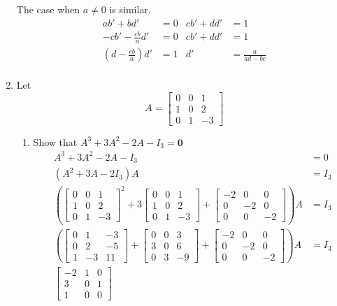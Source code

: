 \documentclass[letterpaper]{article}
\begin{document}
\begin{enumerate}
The case when $a\ne 0$ is similar.
\begin{align*}
  ab'+bd'&=0&cb'+dd'&=1\\
  -cb'-\frac{cb}{a}d'&=0&cb'+dd'&=1\\
  \left(d-\frac{cb}{a}\right)d'&=1&d'&=\frac{a}{ad-bc}\\
\end{align*}

\item
Let
\[A=\left[\begin{array}{ccc}0&0&1\\1&0&2\\0&1&-3\end{array}\right]\]
  \begin{enumerate}
  \item
  Show that $A^3+3A^2-2A-I_3=\mathbf{0}$
  \begin{align*}
    A^3+3A^2-2A-I_3&=0\\
    (A^2+3A-2I_3)A&=I_3\\
    \left( \left[\begin{array}{ccc}0&0&1\\1&0&2\\0&1&-3\end{array}\right]^2
    +3\left[\begin{array}{ccc}0&0&1\\1&0&2\\0&1&-3\end{array}\right]
    +\left[\begin{array}{ccc}-2&0&0\\0&-2&0\\0&0&-2\end{array}\right]
    \right)A&=I_3\\
    \left( \left[\begin{array}{ccc}0&1&-3\\0&2&-5\\1&-3&11\end{array}\right]
    +\left[\begin{array}{ccc}0&0&3\\3&0&6\\0&3&-9\end{array}\right]
    +\left[\begin{array}{ccc}-2&0&0\\0&-2&0\\0&0&-2\end{array}\right]
    \right)A&=I_3\\
    \left[\begin{array}{ccc}-2&1&0\\3&0&1\\1&0&0\end{array}\right]

\end{align*}
\end{enumerate}
\end{enumerate}
\end{document}
